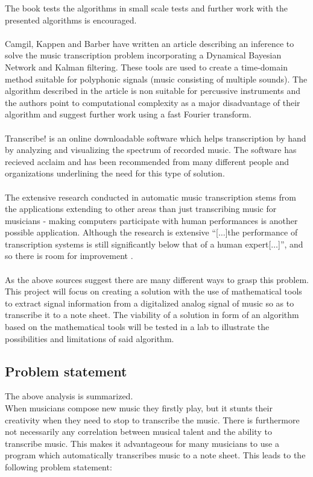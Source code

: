 The book tests the algorithms in small scale tests and further work with the presented algorithms is encouraged.
\\\\
Camgil, Kappen and Barber have written an article \cite{sol2} describing an inference to solve the music transcription problem incorporating a Dynamical Bayesian Network and Kalman filtering. These tools are used to create a time-domain method suitable for polyphonic signals (music consisting of multiple sounds). The algorithm described in the article is non suitable for percussive instruments and the authors point to computational complexity as a major disadvantage of their algorithm and suggest further work using a fast Fourier transform.
\\\\
Transcribe! \cite{transcribe!} is an online downloadable software which helps transcription by hand by analyzing and visualizing the spectrum of recorded music. The software has recieved acclaim and has been recommended from many different people and organizations underlining the need for this type of solution.
\\\\
The extensive research conducted in automatic music transcription stems from the applications extending to other areas than just transcribing music for musicians - making computers participate with human performances is another possible application. Although the research is extensive ``[$\ldots$]the performance of transcription systems is still significantly below that of a human expert[$\ldots$]'', and so there is room for improvement \cite{future}.
\\\\
As the above sources suggest there are many different ways to grasp this problem. This project will focus on creating a solution with the use of mathematical tools to extract signal information from a digitalized analog signal of music so as to transcribe it to a note sheet. The viability of a solution in form of an algorithm based on the mathematical tools will be tested in a lab to illustrate the possibilities and limitations of said algorithm. 
\subsection{Problem statement}
The above analysis is summarized.\\
When musicians compose new music they firstly play, but it stunts their creativity when they need to stop to transcribe the music. There is furthermore not necessarily any correlation between musical talent and the ability to transcribe music. This makes it advantageous for many musicians to use a program which automatically transcribes music to a note sheet. This leads to the following problem statement:

